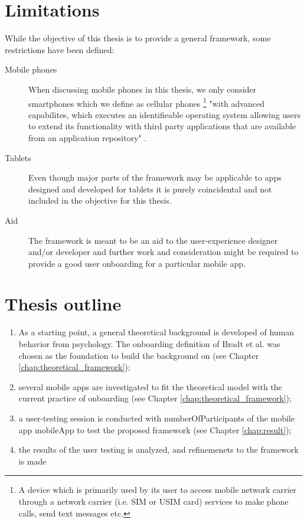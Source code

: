 \section{Limitations}
While the objective of this thesis is to provide a general framework, some restrictions have been defined:
\begin{description}
  \item[Mobile phones] When discussing mobile phones in this thesis, we only consider smartphones which we define as cellular phones \footnote{A device which is primarily used by its user to access mobile network carrier through a network carrier (i.e. SIM or USIM card) services to make phone calls, send text messages etc.} "with advanced capabilites, which executes an identifieable operating system allowing users to extend its functionality with third party applications that are available from an application repository" \cite{Theoharidou2012}.
  \item[Tablets] Even though major parts of the framework may be applicable to apps designed and developed for tablets it is purely coincidental and not included in the objective for this thesis.
  \item[Aid] The framework is meant to be an aid to the user-experience designer and/or developer and further work and consideration might be required to provide a good user onboarding for a particular mobile app.
\end{description}

\section{Thesis outline}
\begin{enumerate}
  \item As a starting point, a general theoretical background is developed of human behavior from psychology. The onboarding definition of Bradt et al. \cite{Bradt2009} was chosen as the foundation to build the background on (see Chapter \ref{chap:theoretical_framework});
  \item several mobile apps are investigated to fit the theoretical model with the current practice of onboarding (see Chapter \ref{chap:theoretical_framework});
  \item a user-testing session is conducted with numberOfParticipants of the mobile app mobileApp to test the proposed framework (see Chapter \ref{chap:result});
  \item the results of the user testing is analyzed, and refinemenets to the framework is made 
\end{enumerate}
